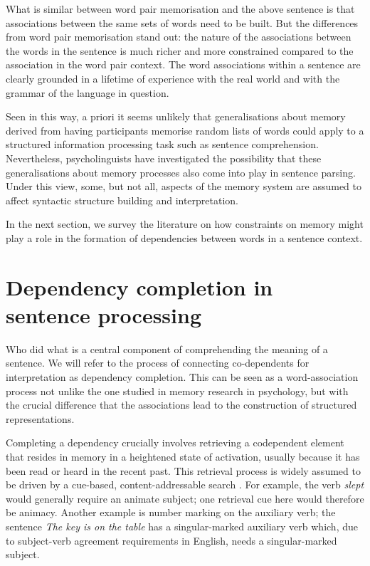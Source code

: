 \documentclass{cambridge7A}\usepackage[]{graphicx}\usepackage[]{color}
\begin{document}
What is similar between word pair memorisation and the above sentence is that associations between the same sets of words need to be built. But the differences from word pair memorisation stand out: the nature of the associations  between the words in the sentence is much richer  and more constrained compared to the association in the word pair context.  The word associations  within a sentence are clearly grounded in a lifetime of experience with the real world and  with the grammar of the language in question. 
  
Seen in this way, a priori it seems unlikely that generalisations about memory derived from having participants memorise random lists of words could apply to a structured information processing task such as sentence comprehension.  Nevertheless, psycholinguists have investigated the possibility that these generalisations about memory processes also come into play in sentence parsing.
 Under this view, some, but not all, aspects of the memory system are assumed to affect syntactic structure building  and interpretation.  
 
In the next section, we survey the literature on how constraints on memory might play a role in the formation of dependencies between words in a sentence context. 
 
 \section{Dependency completion in sentence processing} 

Who did what is a central component of comprehending the meaning of a sentence. We will refer to the process of connecting co-dependents for interpretation as  dependency completion.  This can be seen as a word-association process not unlike the one studied in memory research in psychology, but with the crucial difference that the associations lead to the construction of structured representations. 

 Completing a dependency crucially involves retrieving a codependent element that resides in memory in a heightened state of activation, usually because it has been read or heard in the recent past. 
  This retrieval process is widely assumed to be driven by a  cue-based,   content-addressable search \citep{McElreeForakerDyer2003}. For example, the verb \textit{slept} would  generally require an animate subject; one retrieval cue here would therefore be animacy. Another example is number marking on the auxiliary verb; the sentence \textit{The key is on the table} has a singular-marked auxiliary verb which, due to subject-verb agreement requirements in English, needs a singular-marked subject. 
  
\end{document}
